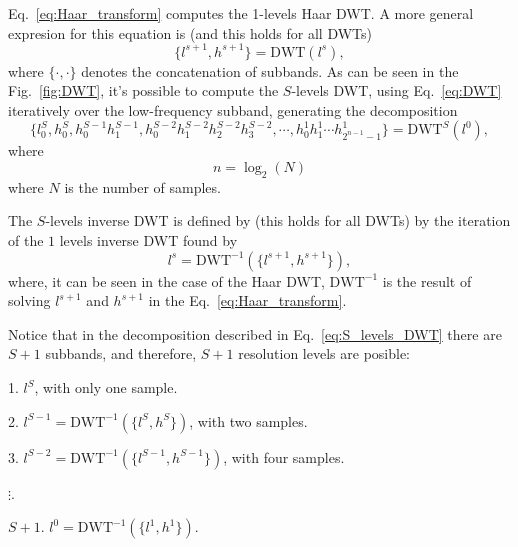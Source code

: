 Eq.~\ref{eq:Haar_transform} computes the 1-levels Haar DWT. A more general expresion for this equation is (and this holds for all DWTs)
\begin{equation}
  \{l^{s+1}, h^{s+1}\} = \text{DWT}(l^s),
  \label{eq:DWT}
\end{equation}
where $\{\cdot,\cdot\}$ denotes the concatenation of subbands. As can
be seen in the Fig.~\ref{fig:DWT}, it's possible to compute the
$S$-levels DWT, using Eq.~\ref{eq:DWT} iteratively over the low-frequency subband, generating the decomposition
\begin{equation}
  \{l^S_0, h^S_0, h^{S-1}_0 h^{S-1}_1, h^{S-2}_0 h^{S-2}_1 h^{S-2}_2
  h^{S-2}_3, \cdots, h^1_0 h^1_1 \cdots
  h^1_{2^{n-1}-1}\}=\text{DWT}^S(l^0),
  \label{eq:S_levels_DWT}
\end{equation}
where
\begin{equation}
  n = \log_2(N)
\end{equation}
where $N$ is the number of samples.

The $S$-levels inverse DWT is defined by (this holds for all DWTs) by the iteration of the $1$ levels inverse DWT found by
\begin{equation}
  l^s = \text{DWT}^{-1}(\{l^{s+1}, h^{s+1}\}),
\end{equation}
where, it can be seen in the case of the Haar DWT, $\text{DWT}^{-1}$
is the result of solving $l^{s+1}$ and $h^{s+1}$ in the
Eq.~\ref{eq:Haar_transform}.

Notice that in the decomposition described in
Eq.~\ref{eq:S_levels_DWT} there are $S+1$ subbands, and therefore,
$S+1$ resolution levels are posible:
\begin{description}
\item 1. $l^S$, with only one sample.
\item 2. $l^{S-1}=\text{DWT}^{-1}(\{l^S, h^S\})$, with two samples.
\item 3. $l^{S-2}=\text{DWT}^{-1}(\{l^{S-1}, h^{S-1}\})$, with four
  samples.
\item $\vdots$.
\item $S+1$. $l^0=\text{DWT}^{-1}(\{l^1, h^1\})$.
\end{description}  

